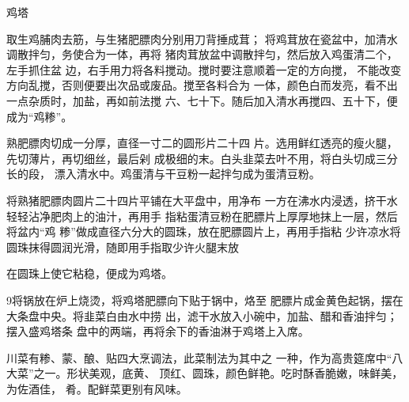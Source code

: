 \begin{recipe}[金钱鸡塔]{鸡塔}

\ingredients



\cooking

\step 	取生鸡脯肉去筋，与生猪肥膘肉分别用刀背捶成茸； 将鸡茸放在瓷盆中，加清水调散拌匀，务使合为一体，再将 猪肉茸放盆中调散拌匀，然后放入鸡蛋清二个，左手抓住盆 边，右手用力将各料搅动。搅时要注意顺着一定的方向搅， 不能改变方向乱搅，否则便要出次品或废品。搅至各料合为 一体，颜色白而发亮，看不出一点杂质时，加盐，再如前法搅 六、七十下。随后加入清水再搅四、五十下，便成为“鸡糁”。

\step 	熟肥膘肉切成一分厚，直径一寸二的圆形片二十四 片。选用鲜红透亮的瘦火腿，先切薄片，再切细丝，最后剁 成极细的末。白头韭菜去叶不用，将白头切成三分长的段， 漂入清水中。鸡蛋清与干豆粉一起拌匀成为蛋清豆粉。

\step 	将熟猪肥膘肉圆片二十四片平铺在大平盘中，用净布 一方在沸水内浸透，挤干水轻轻沾净肥肉上的油汁，再用手 指粘蛋清豆粉在肥膘片上厚厚地抹上一层，然后将盆内“鸡 糁”做成直径六分大的圆珠，放在肥膘圆片上，再用手指粘 少许凉水将圆珠抹得圆润光滑，随即用手指取少许火腿末放

在圆珠上使它粘稳，便成为鸡塔。

\step 9将锅放在炉上烧烫，将鸡塔肥膘向下贴于锅中，烙至 肥膘片成金黄色起锅，摆在大条盘中央。将韭菜白由水中捞 出，滤干水放入小碗中，加盐、醋和香油拌匀；摆入盛鸡塔条 盘中的两端，再将余下的香油淋于鸡塔上入席。

\notes

川菜有糁、蒙、酿、贴四大烹调法，此菜制法为其中之 一种，作为高贵筵席中“八大菜”之一。形状美观，底黄、 顶红、圆珠，颜色鲜艳。吃时酥香脆嫩，味鲜美，为佐酒佳， 肴。配鲜菜更别有风味。

\end{recipe}

